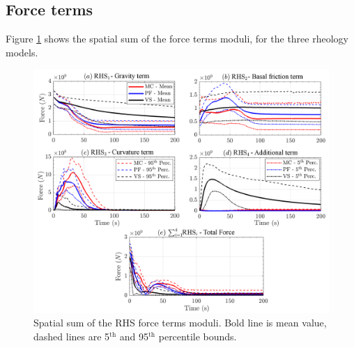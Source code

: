 \documentclass{article}
\begin{document}
\subsection{Force terms}
Figure \ref{fig:Colima-F-spatial} shows the spatial sum of the force terms moduli, for the three rheology models.
\begin{figure}[H]
        \centering
        \includegraphics[width=1\textwidth]{BAF_VolcanDeColima/AveragedMeasurments/ForcesColima.png}
        \caption{Spatial sum of the RHS force terms moduli. Bold line is mean value, dashed lines are 5$^{\mathrm{th}}$ and 95$^{\mathrm{th}}$ percentile bounds.}
        \label{fig:Colima-F-spatial}
\end{figure}
\end{document}
